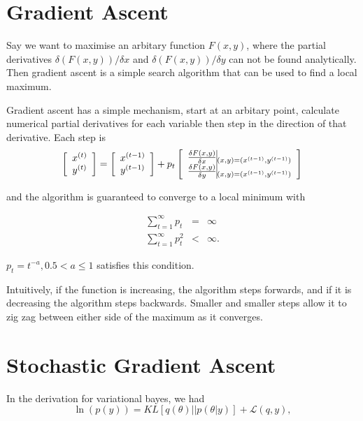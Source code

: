 \documentclass[12pt]{article}
\begin{document}


\section{Gradient Ascent}

Say we want to maximise an arbitary function $F(x, y)$, where the partial derivatives $\delta(F(x, y)) / \delta x$ and $\delta(F(x, y)) / \delta y$ can not be found analytically. Then gradient ascent is a simple search algorithm that can be used to find a local maximum.

Gradient ascent has a simple mechanism, start at an arbitary point, calculate numerical partial derivatives for each variable then step in the direction of that derivative. Each step is
$$\left[ \begin{array}{c}
x^{(t)} \\
y^{(t)} \end{array} \right] 
= 
  \left[ \begin{array}{c}
           x^{(t-1)} \\
           y^{(t-1)}  \end{array} \right] 
+ p_t
  \left[ \begin{array}{c}
         \frac{\delta F(x, y)}{\delta x} \vline_{(x, y) = (x^{(t-1)}, y^{(t-1)})} \\
         \frac{\delta F(x, y)}{\delta y} \vline_{(x, y) = (x^{(t-1)}, y^{(t-1)})} \end{array} \right]
$$

and the algorithm is guaranteed to converge to a local minimum with

\begin{eqnarray*}
\sum_{t=1}^{\infty} p_t & = & \infty \\
\sum_{t=1}^{\infty} p_t^2 & < & \infty.
\end{eqnarray*}

$p_t = t^{-a}, 0.5 < a \leq 1$ satisfies this condition.

Intuitively, if the function is increasing, the algorithm steps forwards, and if it is decreasing the algorithm steps backwards. Smaller and smaller steps allow it to zig zag between either side of the maximum as it converges.

\section{Stochastic Gradient Ascent}

In the derivation for variational bayes, we had
$$\ln(p(y)) = KL [q(\theta) || p(\theta | y)] + \mathcal{L}(q, y),$$
\end{document}
